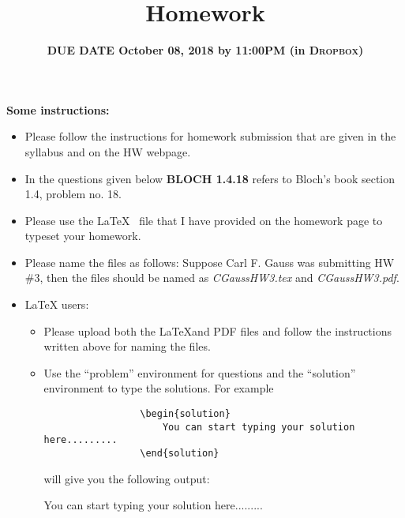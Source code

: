 \documentclass[11pt]{article}
\title{\textbf{\mycourse} \hfill Homework \hwnumber \hfill \textbf{\semesteryear}} %
\author{\myname} %
\date{ \textbf{DUE DATE October 08, 2018 {\red by 11:00PM (in \textsc{Dropbox})}}} %
\newcommand{\hwnumber}{3} %
\begin{document}
\thispagestyle{empty} %
\renewcommand{\arraystretch}{1} %

\clearpage %
\textbf{Some instructions:}
\begin{itemize}
    \item Please follow the instructions for homework submission that are given in the syllabus and on the HW webpage.
    \item In the questions given below \textsf{\bf BLOCH 1.4.18} refers to Bloch's book section 1.4, problem no. 18.
    \item Please use the \LaTeX~ file that I have provided on the homework page to typeset your homework.
    \item Please name the files as follows: Suppose Carl F. Gauss was submitting HW \#\hwnumber, then the files should be named as \textit{CGaussHW\hwnumber.tex} and \textit{CGaussHW\hwnumber.pdf}.
    \item \LaTeX{} users:
        \begin{itemize}
            \item Please upload both the \LaTeX and PDF files and follow the instructions written above for naming the files.
            \item Use the {\blue ``problem'' environment} for questions and the {\blue ``solution'' environment} to type the solutions. For example
            {\magenta
            \begin{verbatim}
                 \begin{solution}
                     You can start typing your solution here.........
                 \end{solution}
            \end{verbatim}
            }
             will give you the following output:

                \begin{solution}
                You can start typing your solution here.........
                \end{solution}


\end{itemize}
\end{itemize}
\end{document}
